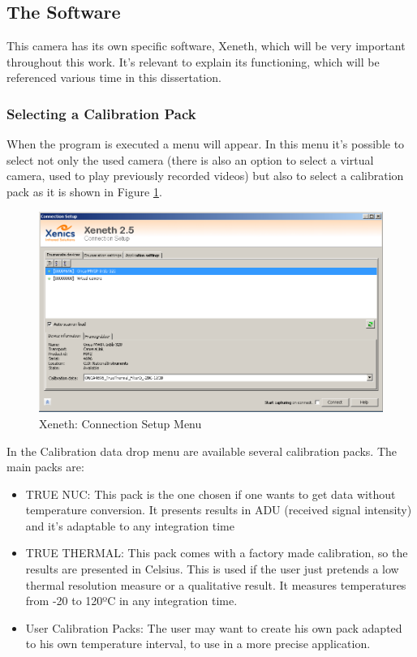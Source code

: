 \subsection{The Software}

\par This camera has its own specific software, Xeneth, which will be very important throughout this work. It's relevant to explain its functioning, which will be referenced various time in this dissertation.

\subsubsection{Selecting a Calibration Pack}

\par When the program is executed a menu will appear. In this menu it's possible to select not only the used camera (there is also an option to select a virtual camera, used to play previously recorded videos) but also to select a calibration pack as it is shown in Figure \ref{fig:consetup}.
\begin{figure}[h]
\centering
\includegraphics[width=0.7\linewidth]{Figures/3.Chapter/xeneth1.png}
\caption{Xeneth: Connection Setup Menu}
\label{fig:consetup}
\end{figure}
\par In the Calibration data drop menu are available several calibration packs. The main packs are:
\begin{itemize}
\item TRUE NUC: This pack is the one chosen if one wants to get data without temperature conversion. It presents results in ADU (received signal intensity) and it's adaptable to any integration time
\item TRUE THERMAL: This pack comes with a factory made calibration, so the results are presented in Celsius. This is used if the user just pretends a low thermal resolution measure or a qualitative result. It measures temperatures from -20 to 120ºC in any integration time.
\item User Calibration Packs: The user may want to create his own pack adapted to his own temperature interval, to use in a more precise application.
\end{itemize}

